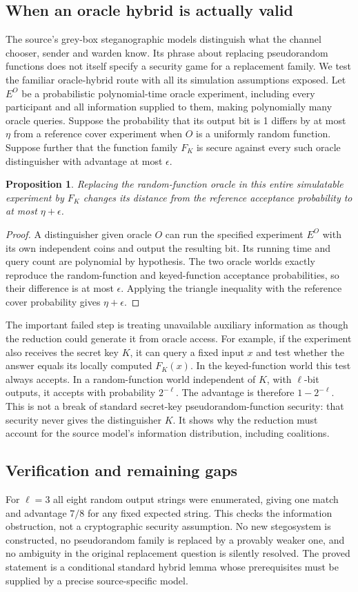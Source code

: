 \documentclass[11pt]{article}
\newtheorem{proposition}{Proposition}
\begin{document}
\subsection{When an oracle hybrid is actually valid}
The source's grey-box steganographic models distinguish what the channel chooser, sender and warden know. Its phrase about replacing pseudorandom functions does not itself specify a security game for a replacement family. We test the familiar oracle-hybrid route with all its simulation assumptions exposed.
Let $E^O$ be a probabilistic polynomial-time oracle experiment, including every participant and all information supplied to them, making polynomially many oracle queries. Suppose the probability that its output bit is 1 differs by at most $\eta$ from a reference cover experiment when $O$ is a uniformly random function. Suppose further that the function family $F_K$ is secure against every such oracle distinguisher with advantage at most $\epsilon$.
\begin{proposition}
Replacing the random-function oracle in this entire simulatable experiment by $F_K$ changes its distance from the reference acceptance probability to at most $\eta+\epsilon$.
\end{proposition}
\begin{proof}
A distinguisher given oracle $O$ can run the specified experiment $E^O$ with its own independent coins and output the resulting bit. Its running time and query count are polynomial by hypothesis. The two oracle worlds exactly reproduce the random-function and keyed-function acceptance probabilities, so their difference is at most $\epsilon$. Applying the triangle inequality with the reference cover probability gives $\eta+\epsilon$.
\end{proof}
The important failed step is treating unavailable auxiliary information as though the reduction could generate it from oracle access. For example, if the experiment also receives the secret key $K$, it can query a fixed input $x$ and test whether the answer equals its locally computed $F_K(x)$. In the keyed-function world this test always accepts. In a random-function world independent of $K$, with $\ell$-bit outputs, it accepts with probability $2^{-\ell}$. The advantage is therefore $1-2^{-\ell}$. This is not a break of standard secret-key pseudorandom-function security: that security never gives the distinguisher $K$. It shows why the reduction must account for the source model's information distribution, including coalitions.
\subsection{Verification and remaining gaps}
For $\ell=3$ all eight random output strings were enumerated, giving one match and advantage $7/8$ for any fixed expected string. This checks the information obstruction, not a cryptographic security assumption. No new stegosystem is constructed, no pseudorandom family is replaced by a provably weaker one, and no ambiguity in the original replacement question is silently resolved. The proved statement is a conditional standard hybrid lemma whose prerequisites must be supplied by a precise source-specific model.
\end{document}
